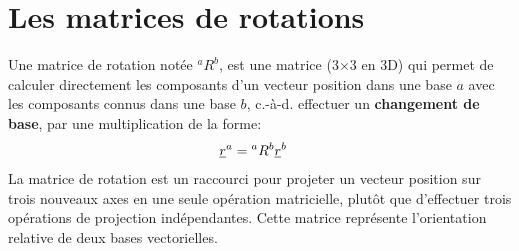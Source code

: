 







\section{Les matrices de rotations}
\label{sec:changematrice}

Une matrice de rotation notée $^aR^b$, est une matrice (3$\times$3 en 3D) qui permet de calculer directement les composants d'un vecteur position dans une base $a$ avec les composants connus dans une base $b$, c.-à-d. effectuer un \textbf{changement de base}, par une multiplication de la forme:
\begin{align}
	\underline{r}^a &= {}^aR^b \underline{r}^b
	\label{eq:basechange}
\end{align}
La matrice de rotation est un raccourci pour projeter un vecteur position sur trois nouveaux axes en une seule opération matricielle, plutôt que d'effectuer trois opérations de projection indépendantes. Cette matrice représente l'orientation relative de deux bases vectorielles.

